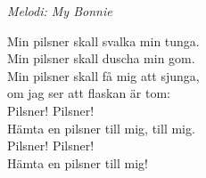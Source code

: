 {\footnotesize\textit{Melodi: My Bonnie}}\par
\vspace{10pt}
Min pilsner skall svalka min tunga.\\
Min pilsner skall duscha min gom.\\
Min pilsner skall få mig att sjunga,\\
om jag ser att flaskan är tom:\\
Pilsner! Pilsner!\\
Hämta en pilsner till mig, till mig.\\
Pilsner! Pilsner!\\
Hämta en pilsner till mig!
